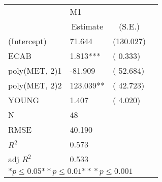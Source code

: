 \begin{tabular}{@{}l*{3}{l}@{}}
\hline
  &\multicolumn{2}{l}{M1  }\tabularnewline
 &\multicolumn{1}{c}{Estimate}&\multicolumn{1}{c}{(S.E.)}\tabularnewline
 \hline
 \hline
  (Intercept) & 71.644 & (130.027) \tabularnewline
  ECAB & 1.813*** & (  0.333) \tabularnewline
  poly(MET, 2)1 & -81.909 & ( 52.684) \tabularnewline
  poly(MET, 2)2 & 123.039** & ( 42.723) \tabularnewline
  YOUNG & 1.407 & (  4.020) \tabularnewline
 \hline
 N&\multicolumn{1}{l}{48}  & \tabularnewline
 RMSE&40.190\tabularnewline
 $R^2$&0.573\tabularnewline
 adj $R^2$&0.533\tabularnewline
 \hline
\hline
 
 \multicolumn{3}{l}{  ${*  p}\le 0.05$${*\!\!*  p}\le 0.01$${*\!\!*\!\!*  p}\le 0.001$}\tabularnewline
 \end{tabular}